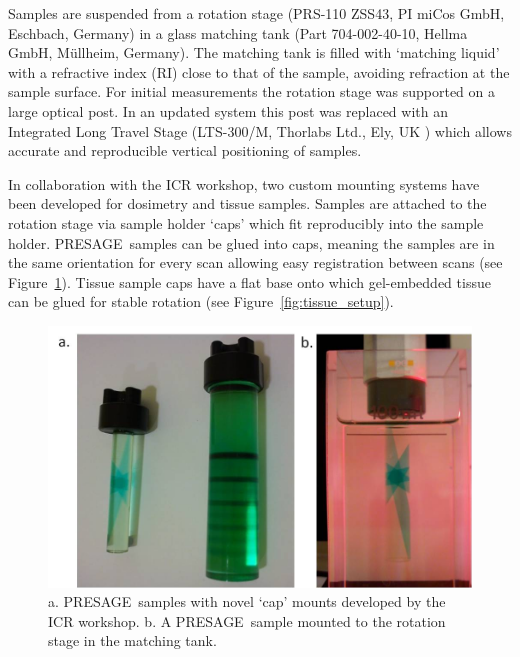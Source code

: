 Samples are suspended from a rotation stage (PRS-110 ZSS43, PI miCos GmbH, Eschbach, Germany) in a glass matching tank (Part 704-002-40-10, Hellma GmbH, M\"{u}llheim, Germany). 
The matching tank is filled with `matching liquid' with a refractive index (RI) close to that of the sample, avoiding refraction at the sample surface. %
For initial measurements  the rotation stage was supported on a large optical post. In an updated system this post was replaced with an Integrated Long Travel Stage (LTS-300/M, Thorlabs Ltd., Ely, UK ) which allows  accurate and reproducible vertical positioning of samples. 

In collaboration with the ICR workshop, two custom mounting systems have been developed for dosimetry and tissue samples. 
Samples are attached to the rotation stage via  sample holder `caps' which fit reproducibly into the sample holder.
 PRESAGE\textregistered \ samples can be glued into caps, meaning the samples are in the same orientation for every scan allowing easy registration between scans (see Figure~\ref{fig:Presage_sample_mounts}). Tissue sample caps have a flat base onto which gel-embedded tissue  can be glued for stable rotation (see Figure~\ref{fig:tissue_setup}). 




\begin{figure}
\centering
\includegraphics[width=0.9\linewidth]{meth_img/Presage_sample_mounts}
\caption{a. PRESAGE\textregistered \ samples with novel `cap' mounts developed by the ICR workshop. b. A PRESAGE\textregistered \ sample mounted to the rotation stage in the matching tank.}
\label{fig:Presage_sample_mounts}
\end{figure}



